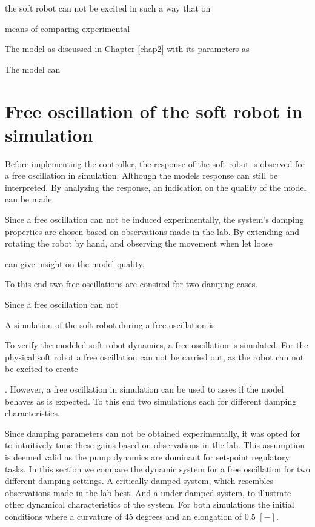 the soft robot can not be excited in such a way that on

means of comparing experimental 



The model as discussed in Chapter \ref{chap2} with its parameters as 



The model can 

\section{Free oscillation of the soft robot in simulation}

Before implementing the controller, the response of the soft robot is observed for a free oscillation in simulation. Although the models response can still be interpreted. By analyzing the response, an indication on the quality of the model can be made.  

Since a free oscillation can not be induced experimentally, the system's damping properties are chosen based on observations made in the lab. By extending and rotating the robot by hand, and observing the movement when let loose



can give insight on the model quality. 


To this end two free oscillations are consired for two damping cases. 

Since a free oscillation can not

A simulation of the soft robot during a free oscillation is 






To verify the modeled soft robot dynamics, a free oscillation is simulated. For the physical soft robot a free oscillation can not be carried out, as the robot can not be excited to create


. However, a free oscillation in simulation can be used to asses if the model behaves as is expected. To this end two simulations each for different damping characteristics.

Since damping parameters can not be obtained experimentally, it was opted for to intuitively tune these gains based on observations in the lab. This assumption is deemed valid as the pump dynamics are dominant for set-point regulatory tasks. In this section we compare the dynamic system for a free oscillation for two different damping settings. A critically damped system, which resembles observations made in the lab best. And a under damped system, to illustrate other dynamical characteristics of the system. For both simulations the initial conditions where a curvature of 45 degrees and an elongation of $0.5$ $[-]$.

